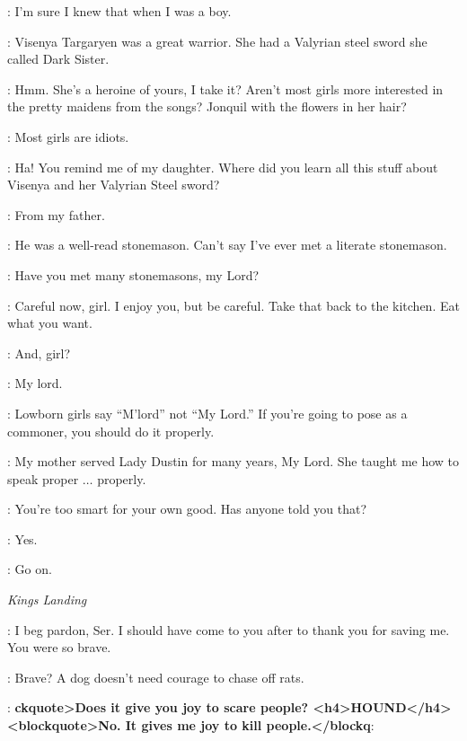 \TYWIN: I'm sure I knew that when I was a boy.

\ARYA: Visenya Targaryen was a great warrior. She had a Valyrian steel sword she called Dark Sister.

\TYWIN: Hmm. She's a heroine of yours, I take it? Aren't most girls more interested in the pretty maidens from the songs? Jonquil with the flowers in her hair?

\ARYA: Most girls are idiots.

\TYWIN: Ha! You remind me of my daughter. Where did you learn all this stuff about Visenya and her Valyrian Steel sword?

\ARYA: From my father.

\TYWIN: He was a well-read stonemason. Can't say I've ever met a literate stonemason.

\ARYA: Have you met many stonemasons, my Lord?

\TYWIN: Careful now, girl. I enjoy you, but be careful. Take that back to the kitchen. Eat what you want.


\TYWIN: And, girl?


\TYWIN: My lord.


\TYWIN: Lowborn girls say ``M'lord'' not ``My Lord.'' If you're going to pose as a commoner, you should do it properly.

\ARYA: My mother served Lady Dustin for many years, My Lord. She taught me how to speak proper $\ldots$ properly.

\TYWIN: You're too smart for your own good. Has anyone told you that?

\ARYA: Yes.

\TYWIN: Go on.



\scene

\textit{Kings Landing}


\SANSA: I beg pardon, Ser. I should have come to you after to thank you for saving me. You were so brave.

\HOUND: Brave? A dog doesn't need courage to chase off rats.

\SANSA: \textbf{ckquote>Does it give you joy to scare people? <h4>HOUND</h4> <blockquote>No. It gives me joy to kill people.</blockq}: 

